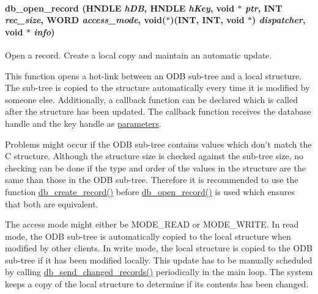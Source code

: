\paragraph[{db\_\-open\_\-record}]{ db\_\-open\_\-record (HNDLE {\em hDB}, \/  HNDLE {\em hKey}, \/  void $\ast$ {\em ptr}, \/  {\bf INT} {\em rec\_\-size}, \/  {\bf WORD} {\em access\_\-mode}, \/  void($\ast$)({\bf INT}, {\bf INT}, void $\ast$) {\em dispatcher}, \/  void $\ast$ {\em info})}\hfill\label{group__odbfunctionc_ga852bc9fa8ee4d0884b328aeb0b0cfd63}
Open a record. Create a local copy and maintain an automatic update.

This function opens a hot-\/link between an ODB sub-\/tree and a local structure. The sub-\/tree is copied to the structure automatically every time it is modified by someone else. Additionally, a callback function can be declared which is called after the structure has been updated. The callback function receives the database handle and the key handle as \hyperlink{structparameters}{parameters}.

Problems might occur if the ODB sub-\/tree contains values which don't match the C structure. Although the structure size is checked against the sub-\/tree size, no checking can be done if the type and order of the values in the structure are the same than those in the ODB sub-\/tree. Therefore it is recommended to use the function \hyperlink{group__odbfunctionc_ga59b971e77416b2b463e2e63f1b05342b}{db\_\-create\_\-record()} before \hyperlink{group__odbfunctionc_ga852bc9fa8ee4d0884b328aeb0b0cfd63}{db\_\-open\_\-record()} is used which ensures that both are equivalent.

The access mode might either be MODE\_\-READ or MODE\_\-WRITE. In read mode, the ODB sub-\/tree is automatically copied to the local structure when modified by other clients. In write mode, the local structure is copied to the ODB sub-\/tree if it has been modified locally. This update has to be manually scheduled by calling \hyperlink{group__odbfunctionc_gae5ccb46009b64dbeff8dbc05be27664b}{db\_\-send\_\-changed\_\-records()} periodically in the main loop. The system keeps a copy of the local structure to determine if its contents has been changed.

